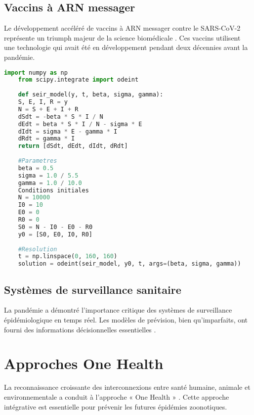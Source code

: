 \documentclass[12pt,a4paper,twoside,openright,openany]{book}
\begin{document}
	\subsection{Vaccins à ARN messager}
	
	Le développement accéléré de vaccins à ARN messager contre le SARS-CoV-2 représente un triumph majeur de la science biomédicale \cite{Polack2020}. Ces vaccins utilisent une technologie qui avait été en développement pendant deux décennies avant la pandémie.
	
	\begin{lstlisting}[language=Python, caption=Simulation de modèle épidémiologique SEIR, label=lst:seir]
	import numpy as np
	from scipy.integrate import odeint
	
	def seir_model(y, t, beta, sigma, gamma):
	S, E, I, R = y
	N = S + E + I + R
	dSdt = -beta * S * I / N
	dEdt = beta * S * I / N - sigma * E
	dIdt = sigma * E - gamma * I
	dRdt = gamma * I
	return [dSdt, dEdt, dIdt, dRdt]
	
	#Parametres
	beta = 0.5
	sigma = 1.0 / 5.5
	gamma = 1.0 / 10.0
	Conditions initiales
	N = 10000
	I0 = 10
	E0 = 0
	R0 = 0
	S0 = N - I0 - E0 - R0
	y0 = [S0, E0, I0, R0]
	
	#Resolution
	t = np.linspace(0, 160, 160)
	solution = odeint(seir_model, y0, t, args=(beta, sigma, gamma))
\end{lstlisting}
	
	\subsection{Systèmes de surveillance sanitaire}
	
	La pandémie a démontré l'importance critique des systèmes de surveillance épidémiologique en temps réel. Les modèles de prévision, bien qu'imparfaits, ont fourni des informations décisionnelles essentielles \cite{Viboud2018}.
	
	\section{Approches One Health}
	
	La reconnaissance croissante des interconnexions entre santé humaine, animale et environnementale a conduit à l'approche « One Health » \cite{Zinsstag2011}. Cette approche intégrative est essentielle pour prévenir les futures épidémies zoonotiques.
	
	\newpage
	
\end{document}
